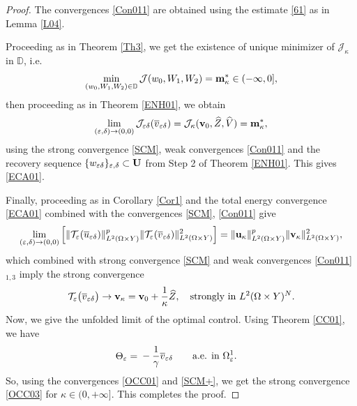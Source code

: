 \documentclass[11pt,a4paper]{article}
\numberwithin{equation}{section}
\def\wo{\overline}
\def\O{\Omega}
\def\d{\delta}
\def\e{\varepsilon}
\def\Te{{\cal T}_\varepsilon}
\def\D{{\mathbb{D}}}
\def\Jc{{\mathcal{J}}}
\def\ed{{\varepsilon\delta}}
\def\wh{\widehat }
\def\X{\times }
\def\Gm{{\bf m}}
\def\Gu{{\bf u}}
\def\Gv{{\bf v}}
\def\Gw{{\bf w}}
\def\GU{{\bf U}}
\begin{document}
	\begin{proof}
		The convergences \eqref{Con011} are obtained using the estimate \eqref{61} as in Lemma \ref{L04}.
		
		Proceeding as in Theorem \ref{Th3}, we get the existence of unique minimizer of $\Jc_\kappa$ in $\D$, i.e.
		$$\min_{(w_0, W_1,W_2)\in\D}\Jc(w_0,W_1,W_2)=\Gm^\ast_\kappa\in(-\infty,0],$$
		then proceeding as in Theorem \ref{ENH01}, we obtain
		$$\lim_{(\e,\d)\to(0,0)}\Jc_\ed(\wo v_\ed)=\Jc_\kappa(\Gv_0,\wh Z,\wh V)=\Gm^\ast_\kappa,$$
		using the strong convergence \eqref{SCM}, weak convergences \eqref{Con011} and the recovery sequence $\{w_\ed\}_{\e,\d}\subset \GU$ from Step 2 of Theorem \ref{ENH01}. This gives \eqref{ECA01}.
		
		Finally, proceeding as in Corollary \ref{Cor1} and the total energy convergence \eqref{ECA01} combined with the convergences \eqref{SCM}, \eqref{Con011} give
		$$
		\lim_{(\e,\d)\to(0,0)}\left[\|\Te(\wo u_\ed)\|^p_{L^2(\O\X Y)}\|\Te(\wo v_\ed)\|^2_{L^2(\O\X Y)}\right]=\|\Gu_\kappa\|^p_{L^2(\O\X Y)}\|\Gv_\kappa\|^2_{L^2(\O\X Y)},$$
		which combined with strong convergence \eqref{SCM} and weak convergences \eqref{Con011}$_{1,3}$ imply the strong convergence
		\begin{equation}\label{SCM+}
			\Te\big(\wo v_\ed\big) \to \Gv_\kappa=\Gv_0+{1\over \kappa}\wh Z,\quad\text{strongly in $L^2(\O\X Y)^{N}$}.
		\end{equation}
		Now, we give the unfolded limit of the optimal control. Using Theorem \ref{CC01}, we have 
		$$\Theta_\e=\begin{aligned}
			&-{1\over \gamma}\wo v_\ed\quad &&\text{a.e. in $\O^1_\e$}.
		\end{aligned}
		$$
		So, using the convergences \eqref{OCC01} and \eqref{SCM+}, we get the strong convergence \eqref{OCC03} for $\kappa\in(0,+\infty]$.
		 This completes the proof.
%		 
	\end{proof}
\end{document}
